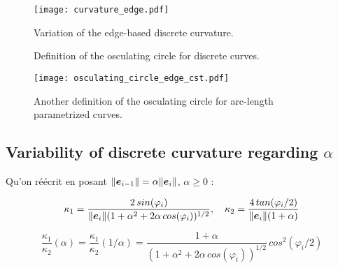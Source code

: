 
\begin{figure}[]
\begin{center}
\texttt{[image: curvature\_edge.pdf]}
\caption{Variation of the edge-based discrete curvature.}
\label{fig:1_1}
\end{center}
\end{figure}



\begin{figure}[h]
     \centering
     \caption{Definition of the osculating circle for discrete curves.}
     \label{steady_state}
\end{figure}

\begin{figure}[H]
\begin{center}
\texttt{[image: osculating\_circle\_edge\_cst.pdf]}
\caption{Another definition of the osculating circle for arc-length parametrized curves.}
\label{fig:1_1}
\end{center}
\end{figure}

\subsection{Variability of discrete curvature regarding $\alpha$}

Qu'on réécrit en posant $\|\boldsymbol{e}_{i-1}\| = \alpha \|\boldsymbol{e}_{i} \|$, $\alpha \geq 0$ :

\begin{equation}
	\kappa_1 = \frac{2 \,sin(\varphi_i)}{\|\boldsymbol{e}_{i}\|(1+ \alpha^2 + 2 \alpha \, cos(\varphi_i))^{1/2}},
	\quad
	\kappa_2 = \frac{4 \,tan(\varphi_i/2)}{\|\boldsymbol{e}_{i}\|(1+\alpha)}
\end{equation}

\begin{equation}
	\frac{\kappa_1}{\kappa_2}(\alpha) = \frac{\kappa_1}{\kappa_2}(1/\alpha)= \frac{1+\alpha}{(1+ \alpha^2 + 2 \alpha \, cos(\varphi_i))^{1/2}} \, cos^2(\varphi_i/2)
\end{equation}

